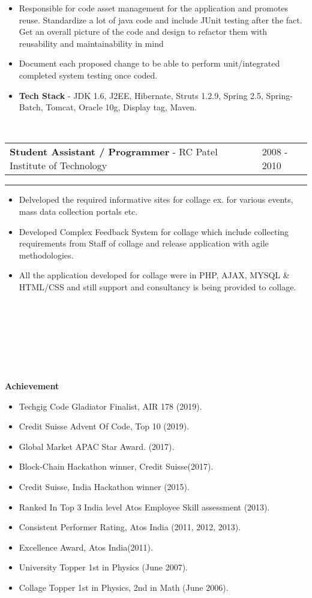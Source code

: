 \documentclass[10pt,A4]{article}
\newcommand{\cvsection}[1]
{
	\begin{center}
		\large\textcolor{sectcol}{\textbf{#1}}
	\end{center}
}
\newcommand{\cvevent}[4]
{

\begin{tabular*}{1\textwidth}{p{13.6cm}  x{3.9cm}}
	\textbf{#2} - \textcolor{bgcol}{#3} &   \vspace{2.0pt}\textcolor{sectcol}{#1}
\end{tabular*}

\vspace{-8pt}
\textcolor{softcol}{\hrule}
\vspace{6pt}

  #4 

}
\begin{document}
{\begin{itemize}
\item Responsible for code asset management for the application and promotes reuse.
Standardize a lot of java code and include JUnit testing after the fact.
Get an overall picture of the code and design to refactor them with reusability and
maintainability in mind
\item Document each proposed change to be able to perform unit/integrated completed
system testing once coded.

\item \textbf{Tech Stack} - JDK 1.6, J2EE, Hibernate, Struts 1.2.9, Spring 2.5,
Spring-Batch, Tomcat, Oracle 10g, Display tag, Maven.

\end{itemize}
}

\ \\
%
\cvevent{2008 - 2010}
{Student Assistant / Programmer}
{RC Patel Institute of Technology}
{
\begin{itemize}
	\item Delveloped the required informative sites for collage ex. for various events, mass data collection portals etc.
	\item Developed Complex Feedback System for collage which include collecting requirements from Staff of collage and release application with agile methodologies.
	\item All the application developed for collage were in PHP, AJAX, MYSQL \& HTML/CSS and still support and consultancy is being provided to collage.
\end{itemize}

}

\ \\ \\
\ \\ \\
\ \\ \\

\cvsection{Achievement}

\begin{itemize}
\item Techgig Code Gladiator Finalist, AIR 178 (2019).
\item Credit Suisse Advent Of Code, Top 10 (2019).
\item Global Market APAC Star Award. (2017).
\item Block-Chain Hackathon winner, Credit Suisse(2017).
\item Credit Suisse, India Hackathon winner (2015).
\item Ranked In Top 3 India level Atos Employee Skill assessment (2013).
\item Consistent Performer Rating, Atos India (2011, 2012, 2013).
\item Excellence Award, Atos India(2011).
\item University Topper 1st in Physics (June 2007).
\item Collage Topper 1st in Physics, 2nd in Math (June 2006).
\end{itemize}
\end{document}
